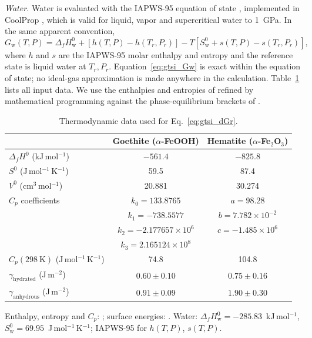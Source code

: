 \textit{Water.} Water is evaluated with the IAPWS-95 equation of state \citep{wagner2002},
implemented in CoolProp \citep{bell2014}, which is valid for liquid, vapor and supercritical
water to 1~GPa. In the same apparent convention,
\begin{equation}
  G_{\mathrm{w}}(T,P) = \Delta_f H_{\mathrm{w}}^{0} + \left[h(T,P) - h(T_r,P_r)\right]
  - T\left[S_{\mathrm{w}}^{0} + s(T,P) - s(T_r,P_r)\right],
  \label{eq:gtsi_Gw}
\end{equation}
where $h$ and $s$ are the IAPWS-95 molar enthalpy and entropy and the reference state is liquid
water at $T_r,P_r$. Equation~\eqref{eq:gtsi_Gw} is exact within the equation of state; no ideal-gas
approximation is made anywhere in the calculation. Table~\ref{tab:gtsi_thermo_data} lists all
input data. We use the enthalpies and entropies of \citet{majzlan2003} refined by mathematical
programming against the phase-equilibrium brackets of \citet{voigt1981}.

\begin{table}[htbp]
  \centering
  \caption{Thermodynamic data used for Eq.~\eqref{eq:gtsi_dGr}.}
  \label{tab:gtsi_thermo_data}
  \begin{footnotesize}
  \begin{tabular}{lcc}
    \hline
    & Goethite ($\alpha$-FeOOH) & Hematite ($\alpha$-Fe$_2$O$_3$) \\
    \hline
    $\Delta_f H^0$ (kJ\,mol$^{-1}$) & $-561.4$ & $-825.8$ \\
    $S^0$ (J\,mol$^{-1}$\,K$^{-1}$) & 59.5 & 87.4 \\
    $V^0$ (cm$^3$\,mol$^{-1}$) & 20.881 & 30.274 \\
    $C_p$ coefficients & $k_0=133.8765$ & $a=98.28$ \\
          & $k_1=-738.5577$ & $b=7.782\times10^{-2}$ \\
          & $k_2=-2.177657\times10^{6}$ & $c=-1.485\times10^{6}$ \\
          & $k_3=2.165124\times10^{8}$ & \\
    $C_p(298\ \mathrm{K})$ (J\,mol$^{-1}$\,K$^{-1}$) & 74.8 & 104.8 \\
    $\gamma_{\mathrm{hydrated}}$ (J\,m$^{-2}$) & $0.60\pm0.10$ & $0.75\pm0.16$ \\
    $\gamma_{\mathrm{anhydrous}}$ (J\,m$^{-2}$) & $0.91\pm0.09$ & $1.90\pm0.30$ \\
    \hline
  \end{tabular}
  \end{footnotesize}

  \vspace{0.5ex}
  \begin{minipage}{0.85\linewidth}\footnotesize
  Enthalpy, entropy and $C_p$: \citet{majzlan2003a,majzlan2003}; surface energies: \citet{navrotsky2008}.
  Water: $\Delta_f H^0_{\mathrm{w}} = -285.83$~kJ\,mol$^{-1}$, $S^0_{\mathrm{w}} = 69.95$~J\,mol$^{-1}$\,K$^{-1}$; IAPWS-95 for $h(T,P)$, $s(T,P)$.
  \end{minipage}
\end{table}

